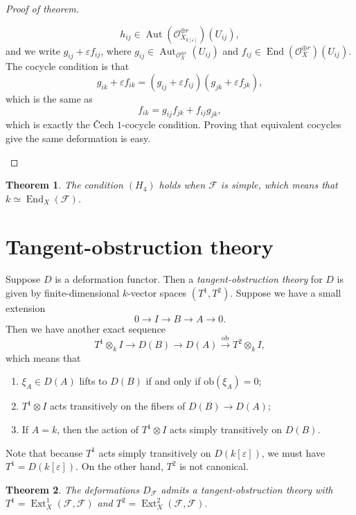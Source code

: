 \documentclass[leqno, openany]{memoir}
\newtheorem{thm}{Theorem}[section]
\theoremstyle{definition}
\theoremstyle{remark}
\theoremstyle{plain}
\theoremstyle{definition}
\theoremstyle{remark}
\newcommand{\ep}{\varepsilon}
\newcommand{\mc}[1]{\mathcal{#1}}
\newcommand{\mr}[1]{\mathrm{#1}}
\DeclareMathOperator{\Ext}{Ext}
\DeclareMathOperator{\End}{End}
\DeclareMathOperator{\Aut}{Aut}
\begin{document}
\begin{proof}[Proof of theorem]
\begin{enumerate}
            \[ h_{ij} \in \Aut(\mc{O}_{X_{k[\ep]}}^{\oplus r})(U_{ij}), \]
            and we write $g_{ij} + \ep f_{ij}$, where $g_{ij} \in \Aut_{\mc{O}_X^{\oplus r}}(U_{ij})$ and $f_{ij} \in \End(\mc{O}_X^{\oplus r})(U_{ij})$. The cocycle condition is that
            \[ g_{ik} + \ep f_{ik} = (g_{ij} + \ep f_{ij})(g_{jk} + \ep f_{jk}), \]
            which is the same as 
            \[ f_{ik} = g_{ij} f_{jk} + f_{ij} g_{jk}, \]
            which is exactly the \v{C}ech $1$-cocycle condition. Proving that equivalent cocycles give the same deformation is easy. \qedhere
    \end{enumerate}
\end{proof}

\begin{thm}
    The condition $(H_4)$ holds when $\mc{F}$ is simple, which means that $k \simeq \End_X(\mc{F})$.
\end{thm}

\section{Tangent-obstruction theory}%
\label{sec:tangent_obstruction_theory}

Suppose $D$ is a deformation functor. Then a \textit{tangent-obstruction theory} for $D$ is given by finite-dimensional $k$-vector spaces $(T^1, T^2)$. Suppose we have a small extension
\[ 0 \to I \to B \to A \to 0. \]
Then we have another exact sequence
\[ T^1 \otimes_k I \to D(B) \to D(A) \xrightarrow{\mr{ob}} T^2 \otimes_k I, \]
which means that
\begin{enumerate}
    \item $\xi_A \in D(A)$ lifts to $D(B)$ if and only if $\mr{ob}(\xi_A) = 0$;
    \item $T^1 \otimes I$ acts transitively on the fibers of $D(B) \to D(A)$;
    \item If $A = k$, then the action of $T^1 \otimes I$ acts simply transitively on $D(B)$.
\end{enumerate}
Note that because $T^1$ acts simply transitively on $D(k[\ep])$, we must have $T^1 = D(k[\ep])$. On the other hand, $T^2$ is not canonical.

\begin{thm}
    The deformations $D_{\mc{F}}$ admits a tangent-obstruction theory with $T^1 = \Ext^1_X(\mc{F}, \mc{F})$ and $T^2 = \Ext^2_X(\mc{F}, \mc{F})$.
\end{thm}
\end{document}
